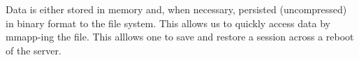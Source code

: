 Data is either stored in memory and, when necessary, persisted (uncompressed) in
binary format to the file system. This allows us to quickly access data by
mmapp-ing the file. This alllows one to save and restore a session across a
reboot of the server.







